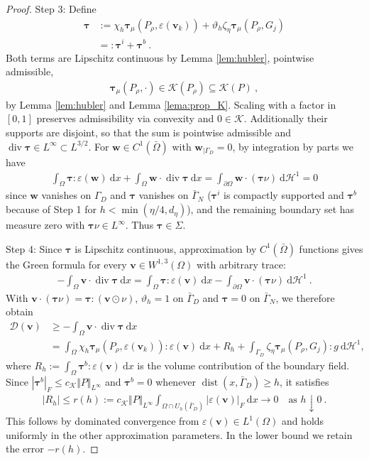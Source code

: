 \documentclass{article}
\theoremstyle{definition}
\newcommand{\bfv}{\boldsymbol{v}}
\newcommand{\bfw}{\boldsymbol{w}}
\newcommand{\bftau}{\boldsymbol{\tau}}
\newcommand{\K}{\mathcal{K}}
\newcommand{\D}{\mathcal{D}}
\newcommand{\dd}{\:\mathrm{d}}
\renewcommand\div{\operatorname{\mathrm{div}}}
\DeclareMathOperator{\dist}{dist}
\begin{document}
\begin{proof}
Step 3:
Define
\begin{align*}
    \bftau &:= \chi_h \bftau_\mu (P_\rho, \varepsilon(\bfv_k)) + \vartheta_h\zeta_\eta\bftau_\mu(P_\rho,G_j) \\
    &=: \bftau^i + \bftau^b \ .
\end{align*}
Both terms are Lipschitz continuous by Lemma \ref{lem:hubler}, pointwise admissible,
\begin{align*}
    \bftau_\mu (P_\rho,\cdot) \in \K(P_\rho) \subseteq \K(P) \ ,
\end{align*}
by Lemma \ref{lem:hubler} and Lemma \ref{lema:prop_K}. Scaling with a factor in $[0,1]$ preserves admissibility via
convexity and $0\in \K$. Additionally their supports are disjoint, so that the sum is pointwise
admissible and $\div \bftau \in L^\infty\subset L^{3/2}$. For $\bfw \in C^1(\bar \Omega)$ with
$\bfw_{|\Gamma_D} =0$, by integration by parts we have
\begin{align}
    \int_\Omega \bftau : \varepsilon(\bfw) \dd x + \int_\Omega \bfw \cdot \div \bftau\dd x
    = \int_{\partial\Omega} \bfw \cdot (\bftau \nu) \dd \mathcal{H}^1 = 0 \label{eq:ip}
\end{align}
since $\bfw$ vanishes on $\Gamma_D$ and $\bftau$ vanishes on $\bar\Gamma_N$ ($\bftau^i$ is compactly
supported and $\bftau^b$ because of Step 1 for $h<\min(\eta/4,d_\eta)$), and the remaining boundary set has measure zero
with $\bftau\nu \in L^\infty$. Thus $\bftau \in \Sigma$.

Step 4:
    Since $\bftau$ is Lipschitz continuous, approximation by $C^1(\bar\Omega)$ functions gives
    the Green formula for every $\bfv\in W^{1,3}(\Omega)$ with arbitrary trace:
    \begin{align*}
        -\int_\Omega\bfv\cdot\div\bftau\dd x
        =\int_\Omega\bftau:\varepsilon(\bfv)\dd x
        -\int_{\partial\Omega}\bfv\cdot(\bftau\nu)\dd\mathcal{H}^1 \ .
    \end{align*}
    With $\bfv\cdot(\bftau\nu)=\bftau:(\bfv\odot\nu)$, $\vartheta_h=1$ on $\bar\Gamma_D$
    and $\bftau=0$ on $\bar\Gamma_N$, we therefore obtain
    \begin{align*}
        \D(\bfv)&\geq-\int_\Omega\bfv\cdot\div\bftau\dd x\\
        &=\int_\Omega\chi_h\bftau_\mu(P_\rho,\varepsilon(\bfv_k)):\varepsilon(\bfv)\dd x
        +R_h+\int_{\Gamma_D}\zeta_\eta\bftau_\mu(P_\rho,G_j):g\dd\mathcal{H}^1,
    \end{align*}
    where $R_h:=\int_\Omega\bftau^b:\varepsilon(\bfv)\dd x$ is the volume contribution of the boundary field.
    Since $|\bftau^b|_F\leq c_\K\Vert P\Vert_{L^\infty}$ and $\bftau^b=0$ whenever
    $\dist(x,\bar\Gamma_D)\geq h$, it satisfies
    \begin{align*}
        |R_h|\leq r(h):=c_\K\Vert P\Vert_{L^\infty}
        \int_{\Omega\cap U_h(\bar\Gamma_D)}|\varepsilon(\bfv)|_F\dd x\rightarrow0
        \quad\text{as }h\downarrow0 \ .
    \end{align*}
    This follows by dominated convergence from $\varepsilon(\bfv)\in L^1(\Omega)$ and holds
    uniformly in the other approximation parameters. In the lower bound we retain the error $-r(h)$.


\end{proof}
\end{document}
